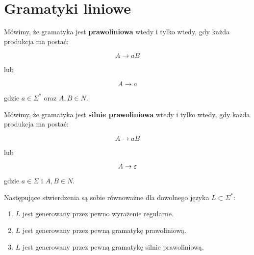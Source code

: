\section{Gramatyki liniowe}

\begin{definition}
	Mówimy, że gramatyka jest \textbf{prawoliniowa} wtedy i tylko wtedy, gdy każda produkcja ma postać:

	\[
		A \rightarrow aB
	\]

	lub

	\[
		A \rightarrow a
	\]

	gdzie \( a \in \Sigma^* \) oraz \( A, B \in N \).

\end{definition}

\begin{definition}
	Mówimy, że gramatyka jest \textbf{silnie prawoliniowa} wtedy i tylko wtedy, gdy każda produkcja ma postać:

	\[
		A \rightarrow aB
	\]

	lub

	\[
		A \rightarrow \varepsilon
	\]

	gdzie \(a \in \Sigma\) i \(A, B \in N\).
\end{definition}

\begin{theorem}
	Następujące stwierdzenia są sobie równoważne dla dowolnego języka \( L \subset \Sigma^* \):

	\begin{enumerate}
		\item \(L\) jest generowany przez pewno wyrażenie regularne.
		\item \(L\) jest generowany przez pewną gramatykę prawoliniową.
		\item \(L\) jest generowany przez pewną gramatykę silnie prawoliniową.
	\end{enumerate}
\end{theorem}


